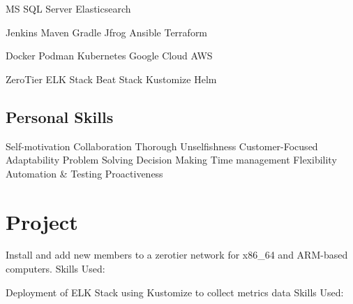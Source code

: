 \documentclass[]{openfont}
\begin{document}
\begin{minipage}[t]{0.33\textwidth}
\textbullet{}MS SQL Server 
\textbullet{}Elasticsearch

\textbullet{}Jenkins 
\textbullet{}Maven
\textbullet{}Gradle
\textbullet{}Jfrog
\textbullet{}Ansible
\textbullet{}Terraform

\textbullet{}Docker 
\textbullet{}Podman 
\textbullet{}Kubernetes
\textbullet{}Google Cloud
\textbullet{}AWS

\textbullet{}ZeroTier
\textbullet{}ELK Stack 
\textbullet{}Beat Stack
\textbullet{}Kustomize
\textbullet{}Helm

\sectionsep

\subsection{Personal Skills}

\textbullet{}Self-motivation 
\textbullet{}Collaboration 
\textbullet{}Thorough
\textbullet{}Unselfishness
\textbullet{}Customer-Focused
\textbullet{}Adaptability 
\textbullet{}Problem Solving 
\textbullet{}Decision Making 
\textbullet{}Time management
\textbullet{}Flexibility
\textbullet{}Automation \& Testing
\textbullet{}Proactiveness

\sectionsep


\section{Project}

Install and add new members to a zerotier network for x86\_64 and ARM-based computers.
Skills Used: 
\sectionsep

Deployment of ELK Stack using Kustomize to collect metrics data
Skills Used: 
\sectionsep

%
%

\end{minipage} 
\end{document}

